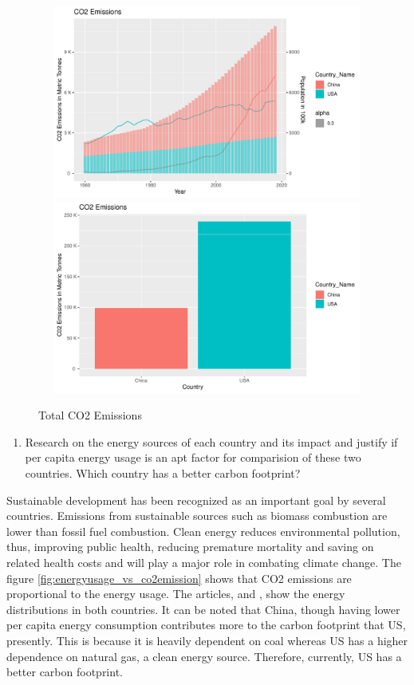 \documentclass[11pt,a4paper,]{article}
\providecommand{\tightlist}{%
  \setlength{\itemsep}{0pt}\setlength{\parskip}{0pt}}
\begin{document}
\begin{figure}[H]
\includegraphics[width=7in, height = 2.5in]{Figures/total_carbon_emissions-1}
\includegraphics[width=7in, height = 2.5in]{Figures/total_carbon_emissions-2}
\caption{Total CO2 Emissions}
\label{fig:total_carbon_emissions}
\end{figure}

\begin{enumerate}
\def\labelenumi{\arabic{enumi})}
\setcounter{enumi}{1}
\tightlist
\item
  Research on the energy sources of each country and its impact and justify if per capita energy usage is an apt factor for comparision of these two countries. Which country has a better carbon footprint?
\end{enumerate}

Sustainable development has been recognized as an important goal by several countries. Emissions from sustainable sources such as biomass combustion are lower than fossil fuel combustion. Clean energy reduces environmental pollution, thus, improving public health, reducing premature mortality and saving on related health costs and will play a major role in combating climate change. The figure \ref{fig:energyusage_vs_co2emission} shows that CO2 emissions are proportional to the energy usage. The articles, \textcite{eia_US} and \textcite{eia_China}, show the energy distributions in both countries. It can be noted that China, though having lower per capita energy consumption contributes more to the carbon footprint that US, presently. This is because it is heavily dependent on coal whereas US has a higher dependence on natural gas, a clean energy source. Therefore, currently, US has a better carbon footprint.
\end{document}

